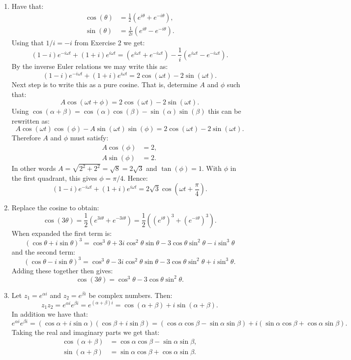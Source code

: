 \begin{enumerate}


\item Have that:
\begin{align*}
    \cos(\theta)&=\frac{1}{2}(e^{i\theta}+e^{-i\theta}), \\
    \sin(\theta)&=\frac{1}{2i}(e^{i\theta}-e^{-i\theta}).
\end{align*}
Using that $1/i=-i$ from Exercise 2 we get:
$$(1-i)e^{-i\omega t}+(1+i)e^{i\omega t}=(e^{i\omega t}+e^{-i\omega t})-\frac{1}{i}(e^{i\omega t}-e^{-i\omega t}).$$
By the inverse Euler relations we may write this as:
$$(1-i)e^{-i\omega t}+(1+i)e^{i\omega t}=2\cos(\omega t)-2\sin(\omega t).$$
Next step is to write this as a pure cosine. That is, determine $A$ and $\phi$ such that:
$$A\cos(\omega t+\phi)=2\cos(\omega t)-2\sin(\omega t).$$
Using $\cos(\alpha+\beta)=\cos(\alpha)\cos(\beta)-\sin(\alpha)\sin(\beta)$ this can be rewritten as:
$$A\cos(\omega t)\cos(\phi)-A\sin(\omega t)\sin(\phi)=2\cos(\omega t)-2\sin(\omega t).$$
Therefore $A$ and $\phi$ must satisfy:
\begin{align*}
    A\cos(\phi) &= 2, \\
    A\sin(\phi) &= 2.
\end{align*}
In other words $A=\sqrt{2^{2}+2^{2}}=\sqrt{8} = 2\sqrt{3}$ and $\tan(\phi) = 1$. 
With $\phi$ in the first quadrant, this gives $\phi=\pi/4$. Hence:
$$(1-i)e^{-i\omega t} + (1+i)e^{i\omega t} = 2\sqrt{3}\cos\left(\omega t+\frac{\pi}{4}\right).$$

\item Replace the cosine to obtain:
$$\cos(3\theta)=\frac{1}{2}(e^{3i\theta}+e^{-3i\theta})=\frac{1}{2}((e^{i\theta})^{3}+(e^{-i\theta})^{3}).$$
When expanded the first term is:
$$(\cos\theta+i\sin\theta)^{3}=\cos^{3}\theta+3i\cos^{2}\theta\sin\theta-3\cos\theta\sin^{2}\theta-i\sin^{3}\theta$$
and the second term:
$$(\cos\theta-i\sin\theta)^{3}=\cos^{3}\theta-3i\cos^{2}\theta\sin\theta-3\cos\theta\sin^{2}\theta+i\sin^{3}\theta.$$
Adding these together then gives:
$$\cos(3\theta)=\cos^{3}\theta-3\cos\theta\sin^{2}\theta.$$

\item Let $z_{1}=e^{\alpha i}$ and $z_{2}=e^{\beta i}$ be complex numbers. Then:
$$z_{1}z_{2}=e^{\alpha i}e^{\beta i}=e^{(\alpha+\beta)i}=\cos(\alpha+\beta)+i\sin(\alpha+\beta).$$
In addition we have that:
$$e^{\alpha i}e^{\beta i}=(\cos\alpha+i\sin\alpha)(\cos\beta+i\sin\beta)=(\cos\alpha\cos\beta-\sin\alpha\sin\beta)+i(\sin\alpha\cos\beta+\cos\alpha\sin\beta).$$
Taking the real and imaginary parts we get that:
\begin{align*}
    \cos(\alpha+\beta) &=\cos\alpha\cos\beta-\sin\alpha\sin\beta, \\
    \sin(\alpha+\beta) &=\sin\alpha\cos\beta+\cos\alpha\sin\beta.
\end{align*}


\end{enumerate}
